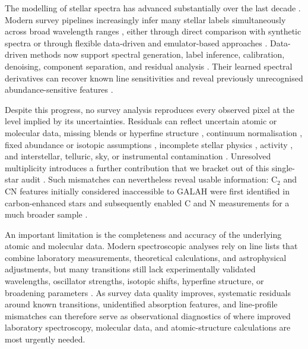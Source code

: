 \documentclass[twocolumn,apj,numberedappendix,appendixfloats]{openjournal}
\begin{document}
The modelling of stellar spectra has advanced substantially over the last decade \citep{Nissen2018,Jofre2019}. Modern survey pipelines increasingly infer many stellar labels simultaneously across broad wavelength ranges \citep[see Tab.~1 of][]{Ness2026b}, either through direct comparison with synthetic spectra or through flexible data-driven and emulator-based approaches \citep[e.g.][]{Ness2015,Casey2016,Ting2019}. Data-driven methods now support spectral generation, label inference, calibration, denoising, component separation, and residual analysis \citep[see][for a review]{Ness2026b}. Their learned spectral derivatives can recover known line sensitivities and reveal previously unrecognised abundance-sensitive features \citep{Buder2018}.

Despite this progress, no survey analysis reproduces every observed pixel at the level implied by its uncertainties. Residuals can reflect uncertain atomic or molecular data, missing blends or hyperfine structure \citep{Heiter2021}, continuum normalisation \citep{Jofre2017}, fixed abundance or isotopic assumptions \citep[e.g.][]{Coelho2007,Yong2004,Masseron2021}, incomplete stellar physics \citep{Amarsi2018,Masseron2021,Lind2024,Bergemann2026}, activity \citep{Lisogorskyi2019,Spina2020,Wilson2023b,Nordlander2024}, and interstellar, telluric, sky, or instrumental contamination \citep{Saydjari2023,Casey2026}. Unresolved multiplicity introduces a further contribution that we bracket out of this single-star audit \citep{ElBadry2018,Merle2024}. Such mismatches can nevertheless reveal usable information: C$_2$ and CN features initially considered inaccessible to GALAH \citep{DeSilva2015} were first identified in carbon-enhanced stars \citep{Cotar2019b} and subsequently enabled C and N measurements for a much broader sample \citep{Buder2025b}.

An important limitation is the completeness and accuracy of the underlying atomic and molecular data. Modern spectroscopic analyses rely on line lists that combine laboratory measurements, theoretical calculations, and astrophysical adjustments, but many transitions still lack experimentally validated wavelengths, oscillator strengths, isotopic shifts, hyperfine structure, or broadening parameters \citep{Heiter2015b}. As survey data quality improves, systematic residuals around known transitions, unidentified absorption features, and line-profile mismatches can therefore serve as observational diagnostics of where improved laboratory spectroscopy, molecular data, and atomic-structure calculations are most urgently needed.
\end{document}
